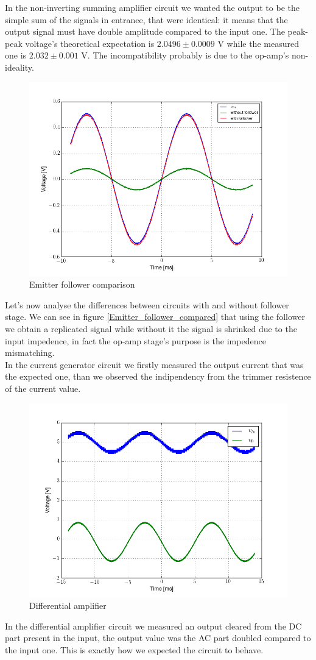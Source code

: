 In the non-inverting summing amplifier circuit we wanted the output to be the simple sum of the signals in entrance, that were identical: it means that the output signal must have double amplitude compared to the input one. The peak-peak voltage's theoretical expectation is $2.0496 \pm 0.0009$ V while the measured one is $2.032 \pm 0.001 $ V. The incompatibility probably is due to the op-amp's non-ideality.
\begin{figure}[H]
\centering
\includegraphics[width=.7\textwidth]{2/Emitter_follower_compared.png}
\caption{Emitter follower comparison}\label{Emitter_follower_compared}
\end{figure}
Let's now analyse the differences between circuits with and without follower stage. We can see in figure \eqref{Emitter_follower_compared} that using the follower we obtain a replicated signal while without it the signal is shrinked due to the input impedence, in fact the op-amp stage's purpose is the impedence mismatching.\\
\newline
In the current generator circuit we firstly measured the output current that was the expected one, than we observed the indipendency from the trimmer resistence of the current value.
\begin{figure}[H]
\centering
\includegraphics[width=.7\textwidth]{2/Differential_amplifier.png}
\caption{Differential amplifier}\label{Differential amplifier}
\end{figure}
In the differential amplifier circuit we measured an output cleared from the DC part present in the input, the output value was the AC part doubled compared to the input one. This is exactly how we expected the circuit to behave.
